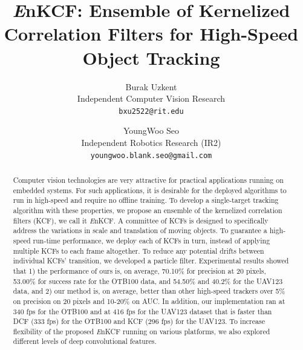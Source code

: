 \documentclass[10pt,twocolumn,letterpaper]{article}
\begin{document}
\title{{\it E}nKCF: Ensemble of Kernelized Correlation Filters for
  High-Speed Object Tracking}

\author{Burak Uzkent \\
Independent Computer Vision Research\\
{\tt\small bxu2522@rit.edu}
\and
YoungWoo Seo \\
Independent Robotics Research (IR2)\\
{\tt\small youngwoo.blank.seo@gmail.com}
}

\maketitle
\ifwacvfinal\thispagestyle{empty}\fi

\begin{abstract}
Computer vision technologies are very attractive for practical
applications running on embedded systems. For such applications, it is
desirable for the deployed algorithms to run in high-speed and require
no offline training. To develop a single-target tracking algorithm
with these properties, we propose an ensemble of the kernelized
correlation filters (KCF), we call it {\it E}nKCF. A committee of KCFs
is designed to specifically address the variations in scale and
translation of moving objects. To guarantee a high-speed run-time
performance, we deploy each of KCFs in turn, instead of applying
multiple KCFs to each frame altogether. To reduce any potential drifts
between individual KCFs' transition, we developed a particle
filter. Experimental results showed that 1) the performance of ours
is, on average, 70.10\% for precision at 20 pixels, 53.00\% for
success rate for the OTB100 data, and 54.50\% and 40.2\% for the
UAV123 data, and 2) our method is, on average, better than other
high-speed trackers over 5\% on precision on 20 pixels and 10-20\% on
AUC. In addition, our implementation ran at 340 fps for the OTB100 and
at 416 fps for the UAV123 dataset that is faster than DCF (333 fps)
for the OTB100 and KCF (296 fps) for the UAV123. To increase
flexibility of the proposed {\it E}nKCF running on various platforms,
we also explored different levels of deep convolutional features.
\end{abstract}
\end{document}
